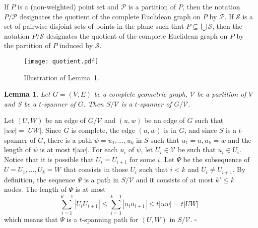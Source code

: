 \documentclass[pdftex,leqno,fleqn,12pt]{article}
\newtheorem{lemma}[theorem]{Lemma}
\newenvironment{proof}{{\textit Proof:} \rm}{\hfill $\square$ \medskip\\}
\newcommand{\old}[1]{{}}
\begin{document}
If $P$ is a (non-weighted) point set and $\mathcal{P}$ is a partition of $P$, then the notation
$P/\mathcal{P}$ designates the quotient of the complete Euclidean graph on $P$ by $\mathcal{P}$. If
$\mathcal{S}$ is a set of pairwise disjoint sets of points in the plane such that $P\subseteq
\bigcup\mathcal{S}$, then the notation $P/\mathcal{S}$ designates the quotient of the complete
Euclidean graph on $P$ by the partition of $P$ induced by $\mathcal{S}$.

\begin{figure}
\centering
\texttt{[image: quotient.pdf]}
\caption{Illustration of Lemma~\ref{thm-quotient}.}
\end{figure}

\begin{lemma}\label{thm-quotient}Let $G=(V,E)$
be a complete geometric graph, $\mathcal{V}$ be a partition of $V$ and $S$ be a $t$-spanner of $G$.
Then $S/\mathcal{V}$ is a $t$-spanner of $G/\mathcal{V}$.
\end{lemma}
\old{
\begin{proof} Let $(U,W)$ be an edge of $G/\mathcal{V}$ and $(u,w)$
be an edge of $G$ such that $|uw|=|UW|$. Since $G$ is complete, the edge $(u,w)$ is in $G$, and
since $S$ is a $t$-spanner of $G$, there is a path $\psi=u_1,\ldots,u_k$ in $S$ such that
$u_1=u,u_k=w$ and the length of $\psi$ is at most $t|uw|$. By definition, $S/\mathcal{V}$ contains
a path $\Psi=U_1,\ldots,U_k$ such that $U_1=U$ and $U_k=W$. The length of $\Psi$ is at most
$$
\sum_{i=1}^{k-1}|U_iU_{i+1}|\leq \sum_{i=1}^{k-1}|u_iu_{i+1}| \leq t|uw| = t|UW|
$$
which means that $\Psi$ is a $t$-spanning path for $(U,W)$ in $S/\mathcal{V}$.
\end{proof}
}
\begin{proof} Let $(U,W)$ be an edge of $G/\mathcal{V}$ and $(u,w)$
be an edge of $G$ such that $|uw|=|UW|$. Since $G$ is complete, the edge $(u,w)$ is in $G$, and
since $S$ is a $t$-spanner of $G$, there is a path $\psi=u_1,\ldots,u_k$ in $S$ such that
$u_1=u,u_k=w$ and the length of $\psi$ is at most $t|uw|$.  For each $u_i$ of $\psi$, let
$U_i\in\mathcal{V}$ be such that $u_i\in U_i$. Notice that it is possible that $U_i=U_{i+1}$ for
some $i$. Let $\Psi$ be the subsequence of $U=U_1,\ldots,U_k=W$ that consists in those $U_i$ such
that $i<k$ and $U_i\neq U_{i+1}$. By definition, the sequence $\Psi$ is a path in $S/\mathcal{V}$
and it consists of at most $k'\leq k$ nodes. The length of $\Psi$ is at most
$$
\sum_{i=1}^{k'-1}|U_iU_{i+1}|\leq \sum_{i=1}^{k-1}|u_iu_{i+1}| \leq t|uw| = t|UW|
$$
which means that $\Psi$ is a $t$-spanning path for $(U,W)$ in $S/\mathcal{V}$.
\end{proof}
\end{document}
